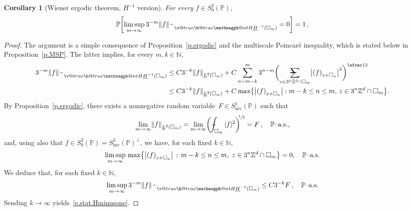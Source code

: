 \documentclass[11pt]{article} %
\makeatletter
\let\oldsquare\square %
\renewcommand{\square}{\oldsquare}
\numberwithin{equation}{section}
\newtheorem{corollary}[theorem]{Corollary}
\theoremstyle{definition}
\let\originalleft\left
\let\originalright\right
\renewcommand{\left}{\mathopen{}\mathclose\bgroup\originalleft}
\renewcommand{\right}{\aftergroup\egroup\originalright}
\newcommand*{\N}{\ensuremath{\mathbb{N}}}
\newcommand*{\Zd}{\ensuremath{\mathbb{Z}^d}}
\renewcommand*{\hat}{\widehat}
\newcommand{\inv}{\mathrm{inv}}
\newcommand{\cu}{\square}
\renewcommand{\P}{\mathbb{P}}
\newcommand{\avsum}{\mathop{\mathpalette\avsuminner\relax}\displaylimits}
\newcommand\avsuminner[2]{%
  {\sbox0{$\m@th#1\sum$}%
   \vphantom{\usebox0}%
   \ooalign{%
     \hidewidth
     \smash{\,\rule[.23em]{8.8pt}{1.1pt} \relax}%
     \hidewidth\cr
     $\m@th#1\sum$\cr
   }%
  }%
}
\def\Xint#1{\mathchoice
{\XXint\displaystyle\textstyle{#1}}%
{\XXint\textstyle\scriptstyle{#1}}%
{\XXint\scriptstyle\scriptscriptstyle{#1}}%
{\XXint\scriptscriptstyle\scriptscriptstyle{#1}}%
\!\int}
\def\XXint#1#2#3{{\setbox0=\hbox{$#1{#2#3}{\int}$}
\vcenter{\hbox{$#2#3$}}\kern-.5\wd0}}
\def\fint{\Xint-}
\newcommand{\negphantom}{\v@true\h@true\negph@nt}
\newcommand{\negph@nt}{\ifmmode\expandafter\mathpalette 
  \expandafter\mathnegph@nt\else\expandafter\makenegph@nt\fi}
\newcommand{\makenegph@nt}[1]{%
  \setbox\z@\hbox{\color@begingroup#1\color@endgroup}\finnegph@nt}
\newcommand{\finnegph@nt}{%
  \setbox\tw@\null 
  \ifv@ \ht\tw@\ht\z@\dp\tw@\dp\z@\fi \ifh@\wd\tw@-\wd\z@\fi\box\tw@}
\newcommand{\mathnegph@nt}[2]{%
  \setbox\z@\hbox{$\m@th #1{#2}$}\finnegph@nt}
\newcommand{\Hminusul}{\hat{\phantom{H}}\negphantom{H}\underline{H}^{-1}}
\makeatother
\begin{document}
\begin{corollary}[Wiener ergodic theorem, $H^{-1}$ version]
\label{c.stat.Hminusone}
For every $f \in S^2_0(\P)$,
\begin{equation}
\label{e.stat.Hminusone}
\P \biggl[
\limsup_{m\to \infty} 
3^{-m}\left\| f   \right\|_{\Hminusul(\cu_m)} 
= 0
\biggr] = 1
\,.
\end{equation}
\end{corollary}
\begin{proof}
The argument is a simple consequence of Proposition~\ref{p.ergodic} and the 
multiscale Poincar\'e inequality, which is stated below in Proposition~\ref{p.MSP}.
The latter implies,  for every $m,k\in\N$,
\begin{align*}
3^{-m} \left\| f \right\|_{\Hminusul(\cu_{m})} 
&
\leq
C3^{-k} \left\| f \right\|_{\underline{L}^2(\cu_{m})}
+
C\sum_{n=m-k}^{m}
3^{n-m}
\biggl( \avsum_{z\in 3^n\Zd \cap \cu_{m}} \left| \left( f \right)_{z+\cu_n} \right|^2 \biggr)^{\sfrac12}
\\ & 
\leq 
C3^{-k} \left\| f \right\|_{\underline{L}^2(\cu_{m})}
+
C \max \bigl\{ 
\left| \left( f \right)_{z+\cu_n} \right|  : m-k\leq n \leq m, \, z\in 3^n\Zd\cap \cu_{m} \bigr\}.
\end{align*}
By Proposition~\ref{p.ergodic}, there exists a nonnegative random variable~$F \in S^1_{\mathrm{inv}}(\P)$ such that 
\begin{equation*}
\lim_{m\to \infty} \left\| f \right\|_{\underline{L}^2(\cu_m)} = 
\lim_{m\to \infty} \biggl( \fint_{\cu_m} |f|^2 \biggr)^{\!\!\sfrac12}
= F \,,
\quad \mbox{$\P$--a.s.,} 
\end{equation*}
and, using also that $f \in S_0^2(\P)= S^2_{\inv}(\P)^\perp$, we have, for each fixed $k\in\N$, 
\begin{equation*}
\limsup_{m\to \infty} \, \max\left\{
\left| \left( f \right)_{z+\cu_n} \right| \,:\, m-k\leq n \leq m, \ z\in 3^n\Zd\cap \cu_{m} \right\}
= 0,
\quad \mbox{$\P$--a.s.}
\end{equation*}
We deduce that, for each fixed $k\in\N$,
\begin{equation}
\limsup_{m\to\infty}
3^{-m}\left\| f \right\|_{\Hminusul(\cu_{m})} 
\leq 
C3^{-k} F\,, \quad \mbox{$\P$--a.s.}
\end{equation}
Sending $k\to \infty$ yields~\eqref{e.stat.Hminusone}.
\end{proof}
\end{document}
